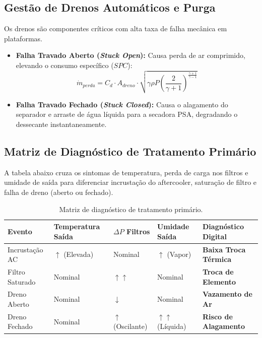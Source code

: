 \documentclass[12pt,a4paper]{article}
\numberwithin{equation}{section}
\numberwithin{table}{section}
\numberwithin{figure}{section}
\begin{document}
	\subsection{Gestão de Drenos Automáticos e Purga}
	Os drenos são componentes críticos com alta taxa de falha mecânica em plataformas.
	\begin{itemize}
		\item \textbf{Falha Travado Aberto (\textit{Stuck Open}):} Causa perda de ar comprimido, elevando o consumo específico ($SPC$):
		\begin{equation}\label{eq:s14-6}
 \dot{m}_{perda} = C_d \cdot A_{dreno} \cdot \sqrt{\gamma \rho P \left( \frac{2}{\gamma+1} \right)^{\frac{\gamma+1}{\gamma-1}}} 
\end{equation}
		\item \textbf{Falha Travado Fechado (\textit{Stuck Closed}):} Causa o alagamento do separador e arraste de água líquida para a secadora PSA, degradando o dessecante instantaneamente.
	\end{itemize}
	
	\subsection{Matriz de Diagnóstico de Tratamento Primário}
	A tabela abaixo cruza os sintomas de temperatura, perda de carga nos filtros e umidade de saída para diferenciar incrustação do aftercooler, saturação de filtro e falha de dreno (aberto ou fechado).

	\begin{table}[h!]
		\centering
		\small
		\begin{tabular}{|l|l|l|l|l|}
			\hline
			\textbf{Evento} & \textbf{Temperatura Saída} & \textbf{$\Delta P$ Filtros} & \textbf{Umidade Saída} & \textbf{Diagnóstico Digital} \\
			\hline
			Incrustação AC & $\uparrow$ (Elevada) & Nominal & $\uparrow$ (Vapor) & \textbf{Baixa Troca Térmica} \\
			Filtro Saturado & Nominal & $\uparrow \uparrow$ & Nominal & \textbf{Troca de Elemento} \\
			Dreno Aberto & Nominal & $\downarrow$ & Nominal & \textbf{Vazamento de Ar} \\
			Dreno Fechado & Nominal & $\uparrow$ (Oscilante) & $\uparrow \uparrow$ (Líquida) & \textbf{Risco de Alagamento} \\
			\hline
		\end{tabular}
		\caption{Matriz de diagnóstico de tratamento primário.}
	\end{table}
\end{document}
